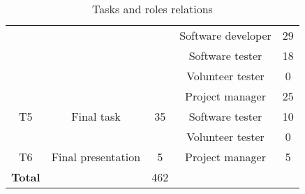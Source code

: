 \begin{table}[!htb]
\begin{tabular}{| c | c | c | c | c |}
  \\ \cline{4-5} & & & \small{Software developer} & \small{29}  
  \\ \cline{4-5} & & & \small{Software tester} & \small{18}
  \\ \cline{4-5} & & & \small{Volunteer tester} & \small{0}
  \\ \hline  \hline 
  \multirow{3}{*}{T5} & \multirow{3}{*}{Final task} & \multirow{3}{*}{35} & Project manager & 25  
  \\ \cline{4-5} & & & Software tester & 10
  \\ \cline{4-5} & & & Volunteer tester & 0
  \\ \hline 
  T6 & Final presentation & 5 &  Project manager & 5 \\ \hline\hline
  \textbf{Total} &  & 462 & & \\ \hline 
  \end{tabular}
  \caption{Tasks and roles relations} \vspace{3pt}
  \label{tab:taskRoles}
\end{table}

\begin{table}[!htb]
\end{table}